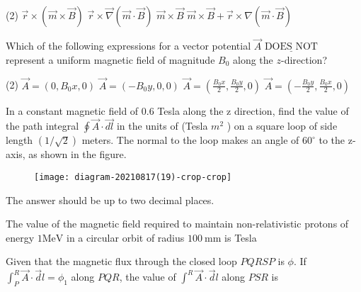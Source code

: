 \begin{enumerate}
\begin{minipage}{\textwidth}
\end{minipage}
\begin{tasks}(2)
	\task[\textbf{A.}] $\vec{r} \times(\vec{m} \times \vec{B})$
	\task[\textbf{B.}]$\vec{r} \times \vec{\nabla}(\vec{m} \cdot \vec{B})$
	\task[\textbf{C.}]$\vec{m} \times \vec{B}$
	\task[\textbf{D.}]$\vec{m} \times \vec{B}+\vec{r} \times \nabla(\vec{m} \cdot \vec{B})$
\end{tasks}
\begin{minipage}{\textwidth}
	\item Which of the following expressions for a vector potential $\vec{A} \underline{\text { DOES NOT }}$ represent a uniform magnetic field of magnitude $B_{0}$ along the $z$-direction?
\end{minipage}
\begin{tasks}(2)
	\task[\textbf{A.}] $\vec{A}=\left(0, B_{0} x, 0\right)$
	\task[\textbf{B.}]$\vec{A}=\left(-B_{0} y, 0,0\right)$
	\task[\textbf{C.}]$\vec{A}=\left(\frac{B_{0} x}{2}, \frac{B_{0} y}{2}, 0\right)$
	\task[\textbf{D.}] $\vec{A}=\left(-\frac{B_{0} y}{2}, \frac{B_{0} x}{2}, 0\right)$
\end{tasks}
\begin{minipage}{\textwidth}
	\item In a constant magnetic field of $0.6$ Tesla along the $\mathrm{z}$ direction, find the value of the path integral $\oint \vec{A} \cdot \overrightarrow{d l}$ in the units of (Tesla $m^{2}$ ) on a square loop of side length $(1 / \sqrt{2})$ meters. The normal to the loop makes an angle of $60^{\circ}$ to the z-axis, as shown in the figure.\\
	\begin{figure}[H]
		\centering
		\texttt{[image: diagram-20210817(19)-crop-crop]}
	\end{figure}	
	The answer should be up to two decimal places.
\end{minipage}
\begin{minipage}{\textwidth}
	\item The value of the magnetic field required to maintain non-relativistic protons of energy $1 \mathrm{MeV}$ in a circular orbit of radius $100 \mathrm{~mm}$ is Tesla
\end{minipage}
\begin{minipage}{\textwidth}
	\item Given that the magnetic flux through the closed loop $P Q R S P$ is $\phi$. If $\int_{P}^{R} \vec{A} \cdot \vec{d} l=\phi_{1}$ along $P Q R$, the value of $\int^{R} \vec{A} \cdot \vec{d} l$ along $P S R$ is

\end{minipage}
\end{enumerate}
